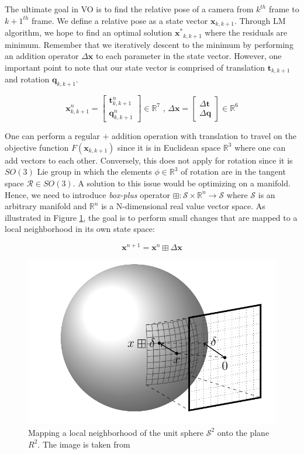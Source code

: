 \documentclass[12pt]{report}
\numberwithin{figure}{section}
\newcommand{\R}{\mathbb{R}}
\begin{document}
\begin{appendices}
The ultimate goal in VO is to find the relative pose of a camera from 
$k^{th}$ frame to $k+1^{th}$ frame. 
We define a relative pose as a state vector $\mathbf{x}_{k,k+1}$. 
Through LM algorithm, we hope to 
find an optimal solution $\mathbf{x^*}_{k,k+1}$ where the residuals are 
minimum.
Remember that we iteratively descent to the minimum by performing an 
addition operator $\Delta \mathbf{x}$ to each parameter in the state vector. 
However, one important point to note that our state vector is comprised of 
translation $\mathbf{t}_{k,k+1}$ and rotation $\mathbf{q}_{k,k+1}$. 

\begin{equation}
  \mathbf{x}^n_{k,k+1} = \begin{bmatrix} \mathbf{t}^n_{k,k+1} \\ \mathbf{q}^n_{k,k+1} \end{bmatrix} \in \R^7
  \text{ ,   } 
  \Delta \mathbf{x} = \begin{bmatrix} \Delta \mathbf{t} \\ \Delta \mathbf{q} \end{bmatrix} \in \R^6
\end{equation}

One can perform a regular $+$ addition operation with translation 
to travel on the objective function $F(\mathbf{x}_{k,k+1})$ since 
it is in Euclidean space $\R^3$ where one can add vectors to each other. 
Conversely, this does not apply for rotation 
since it is $SO(3)$ Lie group in which the elements $\phi \in \R^3$ of 
rotation 
are in the tangent space $\mathcal{R} \in SO(3)$.
A solution to this issue would be optimizing on a manifold.
Hence, we need to introduce \textit{box-plus} operator
$\boxplus : \mathcal{S} \times \R^n \rightarrow \mathcal{S}$ where $\mathcal{S}$ 
is an arbitrary manifold and $\R^n$ is a N-dimensional real value vector space. 
As illustrated in Figure \ref{fig:manifold}, 
the goal is to perform small changes that are mapped to a local neighborhood in 
its own state space:

\begin{equation}
  \mathbf{x}^{n+1} = \mathbf{x}^{n} \boxplus \Delta \mathbf{x}
\end{equation}

\begin{figure}[H]
	\centering
  \includegraphics[width=0.5\linewidth,natwidth=640,natheight=640]
  {fig/ref_imgs/sphere_manifold.png}
  \caption[Sphere Manifold]
  {Mapping a local neighborhood of the unit sphere $\mathcal{S}^2$ 
  onto the plane $R^2$. The image is taken from \parencite{Hertzberg2013}}
	\label{fig:manifold}
\end{figure}



\end{appendices}
\end{document}

